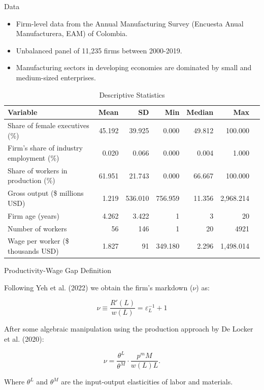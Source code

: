 \documentclass[11pt,aspectratio=169]{beamer}
\begin{document}
\begin{frame}{Data}

\begin{itemize}
  \item Firm-level data from the Annual Manufacturing Survey (Encuesta Anual Manufacturera, EAM) of Colombia.
  \item Unbalanced panel of 11,235 firms between 2000-2019.
  \item Manufacturing sectors in developing economies are dominated by small and medium-sized enterprises.
\end{itemize}

\begin{table}
\centering
\footnotesize
\caption{Descriptive Statistics}
\label{tab:desc_stats}
\begin{tabular}{lrrrrrr}
\toprule
Variable & Mean & SD & Min & Median & Max \\
\midrule
Share of female executives (\%) & 45.192 & 39.925 & 0.000 & 49.812 & 100.000 \\
Firm's share of industry employment (\%) & 0.020 & 0.066 & 0.000 & 0.004 & 1.000 \\
Share of workers in production (\%) & 61.951 & 21.743 & 0.000 & 66.667 & 100.000 \\
Gross output (\$ millions USD) & 1.219 & 536.010 & 756.959 & 11.356 & 2,968.214 \\
Firm age (years) & 4.262 & 3.422 & 1 & 3 & 20 \\
Number of workers & 56 & 146 & 1 & 20 & 4921 \\
Wage per worker (\$ thousands USD) & 1.827 & 91 & 349.180 & 2.296 & 1,498.014 \\
\bottomrule
\end{tabular}
\end{table}

\end{frame}

\begin{frame}{Productivity-Wage Gap Definition}

Following Yeh et al. (2022) we obtain the firm's markdown ($\nu$) as:

\begin{equation}
\nu \equiv \frac{R'(L)}{w(L)} = \varepsilon_L^{-1}+1
\end{equation}

After some algebraic manipulation using the production approach by De Locker et al. (2020):

\begin{equation}
    \nu = \frac{\theta^L}{\theta^M} \cdot 
    \frac{{p^m} M}{w(L)L}.
\end{equation}

Where $\theta^L$ and $\theta^M$ are the input-output elasticities of labor and materials.

\end{frame}
\end{document}
